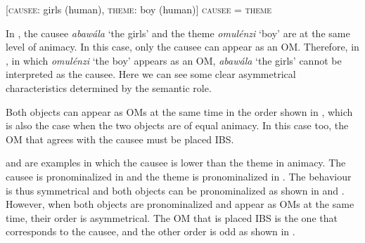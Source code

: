 \documentclass[output=paper,
            colorlinks, citecolor=brown
            ,draftmode
		  ]{langscibook}
\begin{document}
\ea%
    \label{ex:yoneda:38}
    [\textsc{causee}: girls (human), \textsc{theme}: boy (human)]  \textsc{causee} = \textsc{theme} 
    \z
\z
                 

  In , the causee \textit{abawála} ‘the girls’ and the theme \textit{omulénzi} ‘boy’ are at the same level of animacy. In this case, only the causee can appear as an OM. Therefore, in , in which \textit{omulénzi} ‘the boy’ appears as an OM, \textit{abawála} ‘the girls’ cannot be interpreted as the causee. Here we can see some clear asymmetrical characteristics determined by the semantic role.


     Both objects can appear as OMs at the same time in the order shown in , which is also the case when the two objects are of equal animacy. In this case too, the OM that agrees with the causee must be placed IBS. 



\ea%
    \label{ex:yoneda:39}
    \z
\z


 and  are examples in which the causee is lower than the theme in animacy. The causee is pronominalized in  and the theme is pronominalized in . The behaviour is thus symmetrical and both objects can be pronominalized as shown in  and . However, when both objects are pronominalized and appear as OMs at the same time, their order is asymmetrical. The OM that is placed IBS is the one that corresponds to the causee, and the other order is odd as shown in . 
\end{document}
